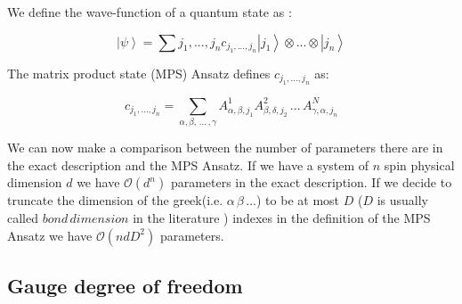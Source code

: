 \documentclass[12pt, a4paper, twoside, titlepage]{article}
\newcommand{\ket}[1]{\ensuremath{\left|#1\right\rangle}}
\begin{document}
We define the wave-function of a quantum state as \cite{Schollw_ck_2011}:

\begin{equation}
\ket \psi = \sum{j_1,...,j_n} c_{j_1,...,j_n}  \ket{j_1} \otimes ... \otimes \ket{j_n}
\end{equation}

The matrix product state (MPS) Ansatz defines $c_{j_1,...,j_n}$ as:

\begin{equation}
c_{j_1,...,j_n}= \sum_{\alpha , \beta, \, ... \, , \gamma } A^{1}_{\alpha , \beta , j_1} A^{2}_{ \beta , \delta ,  j_2} \, ... \, A^{N}_{  \gamma , \alpha ,j_n}
\end{equation}

We can now make a comparison between the number of parameters there are in the exact description and the MPS Ansatz. If we have a system of $n$ spin physical dimension $d$ we have $\mathcal{O}(d^n)$ parameters in the exact description. If we decide to truncate the dimension of the greek(i.e. $\alpha \, \beta \, ...$) to be at most $D$ ($D$ is usually called $bond \, dimension$ in the literature ) indexes in the definition of the MPS Ansatz we have $\mathcal{O}(n d D^2 )$ parameters. \\
\subsection{Gauge degree of freedom}
\end{document}
